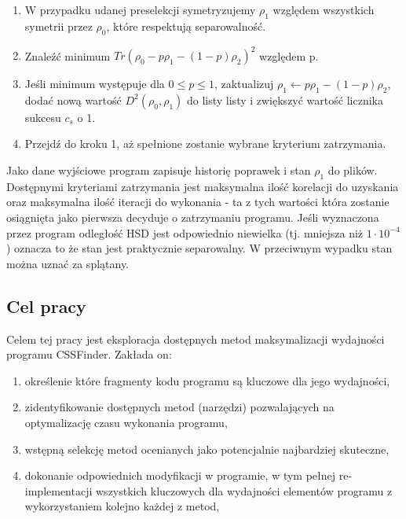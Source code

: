 \documentclass[11pt, a4paper]{article}
\begin{document}
\begin{sloppypar}
\begin{enumerate}
      \item W przypadku udanej preselekcji symetryzujemy $\rho_{1}$ względem wszystkich symetrii
        przez $\rho_{0}$, które respektują separowalność.

      \item Znaleźć minimum $Tr(\rho_{0}- p\rho_{1}- (1 - p)\rho_{2})^{2}$ względem p.

      \item Jeśli minimum występuje dla $0 \le p \le 1$, zaktualizuj
        $\rho_{1}\leftarrow p\rho_{1}- (1 - p)\rho_{2}$, dodać nową wartość $D^{2}(\rho_{0}
        , \rho_{1})$ do listy listy i zwiększyć wartość licznika sukcesu $c_{s}$ o 1.

      \item Przejdź do kroku 1, aż spełnione zostanie wybrane kryterium zatrzymania.
    \end{enumerate}

    Jako dane wyjściowe program zapisuje historię poprawek i stan $\rho_{1}$ do plików. Dostępnymi
    kryteriami zatrzymania jest maksymalna ilość korelacji do uzyskania oraz maksymalna ilość
    iteracji do wykonania - ta z tych wartości która zostanie osiągnięta jako pierwsza decyduje
    o zatrzymaniu programu. Jeśli wyznaczona przez program odległość HSD jest
    odpowiednio niewielka (tj. mniejsza niż $1 \cdot 10^{-4}$) oznacza to że stan jest praktycznie
    separowalny. W przeciwnym wypadku stan można uznać za splątany.

    \subsection{Cel pracy}
    Celem tej pracy jest eksploracja dostępnych metod maksymalizacji wydajności programu
    CSSFinder. Zakłada on:
    \begin{enumerate}
      \item określenie które fragmenty kodu programu są kluczowe dla jego wydajności,

      \item zidentyfikowanie dostępnych metod (narzędzi) pozwalających na optymalizację czasu
        wykonania programu,

      \item wstępną selekcję metod ocenianych jako potencjalnie najbardziej skuteczne,

      \item dokonanie odpowiednich modyfikacji w programie, w tym pełnej re-implementacji
        wszystkich kluczowych dla wydajności elementów programu z wykorzystaniem kolejno
        każdej z metod,


\end{enumerate}
\end{sloppypar}
\end{document}
